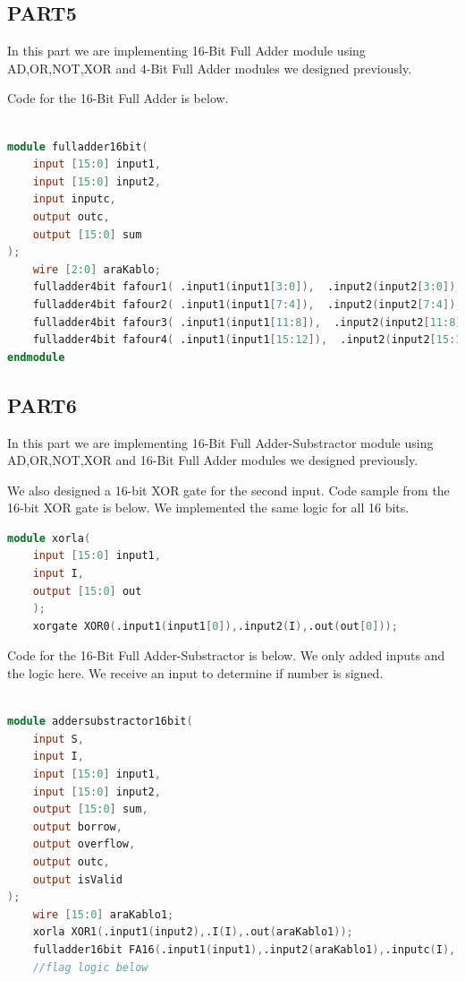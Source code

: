 \documentclass[pdftex,12pt,a4paper]{article}
\begin{document}
\subsection{PART5}
In this part we are implementing 16-Bit Full Adder module using AD,OR,NOT,XOR and 4-Bit Full Adder modules we designed previously.

Code for the 16-Bit Full Adder is below.

\begin{lstlisting}[language = Verilog]

module fulladder16bit(
    input [15:0] input1,
    input [15:0] input2,
    input inputc,
    output outc,
    output [15:0] sum
);
    wire [2:0] araKablo;
    fulladder4bit fafour1( .input1(input1[3:0]),  .input2(input2[3:0]), .inputc(inputc), .outc(araKablo[0]), .sum(sum[3:0])  );
    fulladder4bit fafour2( .input1(input1[7:4]),  .input2(input2[7:4]), .inputc(araKablo[0]), .outc(araKablo[1]), .sum(sum[7:4])  );
    fulladder4bit fafour3( .input1(input1[11:8]),  .input2(input2[11:8]), .inputc(araKablo[1]), .outc(araKablo[2]), .sum(sum[11:8])  );
    fulladder4bit fafour4( .input1(input1[15:12]),  .input2(input2[15:12]), .inputc(araKablo[2]), .outc(outc), .sum(sum[15:12])  );
endmodule

\end{lstlisting}


\subsection{PART6}
In this part we are implementing 16-Bit Full Adder-Substractor module using AD,OR,NOT,XOR and 16-Bit Full Adder modules we designed previously.

We also designed a 16-bit XOR gate for the second input. Code sample from the 16-bit XOR gate is below. We implemented the same logic for all 16 bits.

\begin{lstlisting}[language = Verilog]
module xorla(
    input [15:0] input1,
    input I,
    output [15:0] out
    );
    xorgate XOR0(.input1(input1[0]),.input2(I),.out(out[0]));
\end{lstlisting}

Code for the 16-Bit Full Adder-Substractor is below. We only added inputs and the logic here. We receive an input to determine if number is signed.

\begin{lstlisting}[language = Verilog]

module addersubstractor16bit(
    input S,
    input I,
    input [15:0] input1,
    input [15:0] input2,
    output [15:0] sum,
    output borrow,
    output overflow,
    output outc,
    output isValid
);
    wire [15:0] araKablo1;
    xorla XOR1(.input1(input2),.I(I),.out(araKablo1));
    fulladder16bit FA16(.input1(input1),.input2(araKablo1),.inputc(I),.outc(outc),.sum(sum));
    //flag logic below
\end{lstlisting}
\end{document}
